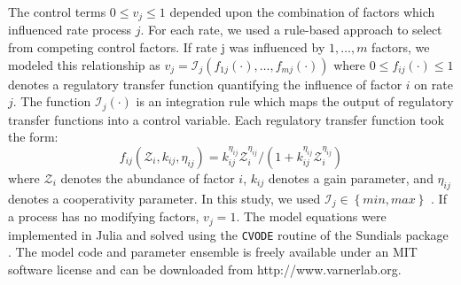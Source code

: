 \documentclass[12pt]{article}
\begin{document}
The control terms $0\leq v_{j}\leq 1$ depended upon the combination of factors which influenced rate process $j$.
For each rate, we used a rule-based approach to select from competing control factors.
If rate j was influenced by $1,\dots,m$ factors, we modeled this relationship as
$v_{j}=\mathcal{I}_{j}\left(f_{1j}\left(\cdot\right),\hdots,f_{mj}\left(\cdot\right)\right)$
where $0\leq f_{ij}\left(\cdot\right)\leq 1$ denotes a regulatory transfer function quantifying the influence of factor $i$ on rate $j$.
The function $\mathcal{I}_{j}\left(\cdot\right)$ is an integration rule which maps the output of regulatory transfer functions into a control
variable. Each regulatory transfer function took the form:
\begin{equation}\label{eqn:control-factor}
	f_{ij}\left(\mathcal{Z}_{i},k_{ij},\eta_{ij}\right)=k_{ij}^{\eta_{ij}}\mathcal{Z}_{i}^{\eta_{ij}}/\left({1 + k_{ij}^{\eta_{ij}}\mathcal{Z}_{i}^{\eta_{ij}}}\right)
\end{equation}where $\mathcal{Z}_{i}$ denotes the abundance of factor $i$, $k_{ij}$ denotes a gain parameter, and $\eta_{ij}$ denotes a cooperativity parameter.
In this study, we used $\mathcal{I}_{j}\in\left\{min,max\right\}$ \cite{pr3010178}. If a process has no modifying factors, $v_{j}=1$.
The model equations were implemented in Julia and solved using the \texttt{CVODE} routine of the Sundials package \cite{Julia,Sundials}.
The model code and parameter ensemble is freely available under an MIT software license and can be downloaded from http://www.varnerlab.org.
\end{document}
